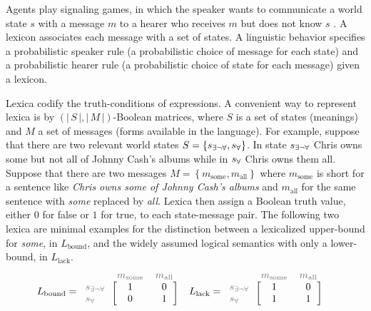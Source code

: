 \documentclass[a4paper, 11pt]{article}
\theoremstyle{Satz}
\newcommand{\set}[1]{\left\{#1\right\}}
\newcommand{\card}[1]{\left \lvert \, #1 \, \right\rvert}
\newcommand{\States}{\ensuremath{S}\xspace}		%
\newcommand{\state}{\ensuremath{s}\xspace}		%
\newcommand{\mystate}[1]{\ensuremath{\state_{\text{#1}}}\xspace} %
\newcommand{\mylang}[1]{\ensuremath{L_{\text{#1}}}\xspace} %
\newcommand{\Messgs}{\ensuremath{M}\xspace}		%
\newcommand{\messg}{\ensuremath{m}\xspace}		%
\newcommand{\mymessg}[1]{\ensuremath{\messg_{\text{#1}}}\xspace} %
\newcommand{\ssome}{\mystate{\ensuremath{\exists\neg\forall}}}
\newcommand{\sall}{\mystate{\ensuremath{\forall}}}
\newcommand{\msome}{\mymessg{some}}
\newcommand{\mall}{\mymessg{all}}
\newcommand{\Lbound}{\mylang{bound}}
\newcommand{\Llack}{\mylang{lack}}
\newcommand{\mygray}[1]{{\textcolor{mygray}{#1}}}
\begin{document}
Agents play signaling games, in which the speaker wants to communicate a world state $s$ with a
message $m$ to a hearer who receives $m$ but does not know $s$
\citep[e.g.][]{lewis:1969,Skyrms2010:Signals}. A lexicon associates each message with a set of
states. A linguistic behavior specifies a probabilistic speaker rule (a probabilistic choice of
message for each state) and a probabilistic hearer rule (a probabilistic choice of state for
each message) given a lexicon.

Lexica codify the truth-conditions of expressions. A convenient way to represent lexica is by
$(\card{\States}, \card{\Messgs})$-Boolean matrices, where $\States$ is a set of states
(meanings) and $M$ a set of messages (forms available in the language). For example, suppose
that there are two relevant world states $\States = \set{\ssome, \sall}$. In state $\ssome$
Chris owns some but not all of Johnny Cash's albums while in $\sall$ Chris owns them
all. Suppose that there are two messages $\Messgs = \set{\msome, \mall}$ where $\msome$ is
short for a sentence like \emph{Chris owns some of Johnny Cash's albums} and $\mall$ for the
same sentence with \emph{some} replaced by \emph{all}.  Lexica then assign a Boolean truth
value, either $0$ for false or $1$ for true, to each state-message pair. The following two
lexica are minimal examples for the distinction between a lexicalized upper-bound for
\emph{some}, in $\Lbound$, and the widely assumed logical semantics with only a lower-bound, in
$\Llack$.
\begin{align*}
  \Lbound & = \begin{blockarray}{lcc}
    & \mygray{\msome} & \mygray{\mall} \\
    \begin{block}{l[cc]}
      \mygray{\ssome} & 1 & 0 \\
      \mygray{\sall}  & 0 & 1 \\
    \end{block}
  \end{blockarray} &
  \Llack & = \begin{blockarray}{lcc}
    & \mygray{\msome} & \mygray{\mall} \\
    \begin{block}{l[cc]}
      \mygray{\ssome} & 1 & 0 \\
      \mygray{\sall}  & 1 & 1 \\
    \end{block}
  \end{blockarray}
\end{align*}
\end{document}
